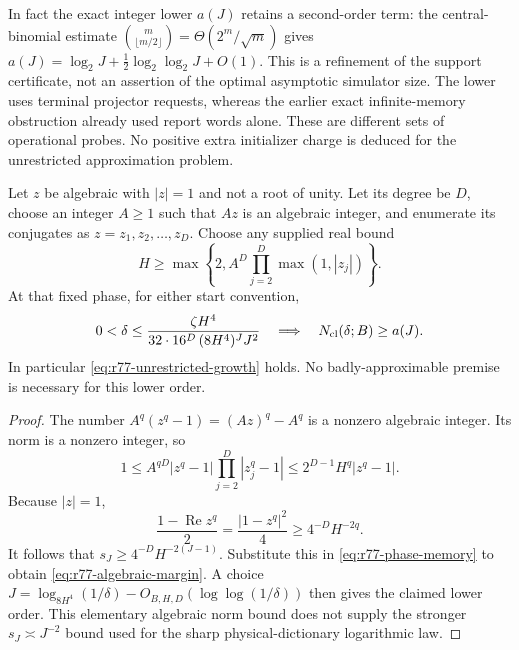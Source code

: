 In fact the exact integer lower $a(J)$ retains a second-order term:
the central-binomial estimate
$\binom{m}{\lfloor m/2\rfloor}=\Theta(2^m/\sqrt m)$ gives
$a(J)=\log_2J+\tfrac12\log_2\log_2J+O(1)$.
This is a refinement of the support certificate, not an assertion of
the optimal asymptotic simulator size.  The lower uses terminal
projector requests, whereas the earlier exact infinite-memory
obstruction already used report words alone.  These are different
sets of operational probes.  No positive extra initializer charge is
deduced for the unrestricted approximation problem.

\begin{corollary}
\label{cor:r77-algebraic-unrestricted}
Let $z$ be algebraic with $|z|=1$ and not a root of unity.  Let its
degree be $D$, choose an integer $A\ge1$ such that $Az$ is an
algebraic integer, and enumerate its conjugates as
$z=z_1,z_2,\ldots,z_D$.  Choose any supplied real bound
\[
 H\ge\max\left\{2,
             A^D\prod_{j=2}^D\max(1,|z_j|)\right\}.
\]
At that fixed phase, for either start convention,
\begin{equation}\label{eq:r77-algebraic-margin}
 0<\delta\le
 \frac{\zeta H^4}{32\cdot16^D\,(8H^4)^J J^2}
 \quad\Longrightarrow\quad N_{\rm cl}(\delta;B)\ge a(J).
\end{equation}
In particular \eqref{eq:r77-unrestricted-growth} holds.  No
badly-approximable premise is necessary for this lower order.
\end{corollary}
\begin{proof}
The number $A^q(z^q-1)=(Az)^q-A^q$ is a nonzero algebraic integer.
Its norm is a nonzero integer, so
\[
 1\le A^{qD}|z^q-1|\prod_{j=2}^D|z_j^q-1|
   \le 2^{D-1}H^q|z^q-1|.
\]
Because $|z|=1$,
\[
 \frac{1-\operatorname{Re}z^q}{2}
   =\frac{|1-z^q|^2}{4}\ge4^{-D}H^{-2q}.
\]
It follows that $s_J\ge4^{-D}H^{-2(J-1)}$.
Substitute this in \eqref{eq:r77-phase-memory} to obtain
\eqref{eq:r77-algebraic-margin}.  A choice
$J=\log_{8H^4}(1/\delta)-O_{B,H,D}(\log\log(1/\delta))$
then gives the claimed lower order.  This elementary algebraic norm
bound does not supply the stronger $s_J\asymp J^{-2}$ bound used for
the sharp physical-dictionary logarithmic law.
\end{proof}
